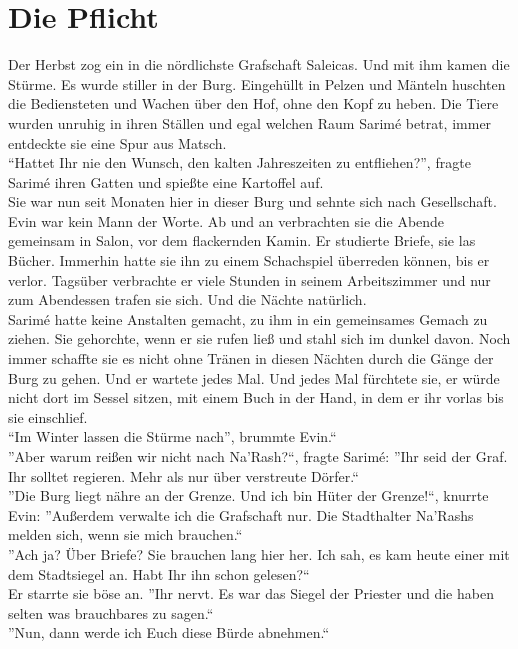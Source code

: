 
\chapter{Die Pflicht}

Der Herbst zog ein in die nördlichste Grafschaft Saleicas. Und mit ihm kamen die Stürme. Es wurde 
stiller in der Burg. Eingehüllt in Pelzen und Mänteln huschten die Bediensteten und Wachen über den 
Hof, ohne den Kopf zu heben. Die Tiere wurden unruhig in ihren Ställen und egal welchen Raum Sarimé 
betrat, immer entdeckte sie eine Spur aus Matsch.\\
``Hattet Ihr nie den Wunsch, den kalten Jahreszeiten zu entfliehen?'', fragte Sarimé ihren Gatten 
und spießte eine Kartoffel auf.\\
Sie war nun seit Monaten hier in dieser Burg und sehnte sich nach Gesellschaft. Evin war kein Mann 
der Worte. Ab und an verbrachten sie die Abende gemeinsam in Salon, vor dem flackernden Kamin. Er 
studierte Briefe, sie las Bücher. Immerhin hatte sie ihn zu einem Schachspiel überreden können, bis 
er verlor. Tagsüber verbrachte er viele Stunden in seinem Arbeitszimmer und nur zum Abendessen 
trafen sie sich. Und die Nächte natürlich.\\
Sarimé hatte keine Anstalten gemacht, zu ihm in ein gemeinsames Gemach zu ziehen. Sie gehorchte, 
wenn er sie rufen ließ und stahl sich im dunkel davon. Noch immer schaffte sie es nicht ohne Tränen 
in diesen Nächten durch die Gänge der Burg zu gehen. Und er wartete jedes Mal. Und jedes Mal 
fürchtete sie, er würde nicht dort im Sessel sitzen, mit einem Buch in der Hand, in dem er ihr 
vorlas bis sie einschlief.\\
``Im Winter lassen die Stürme nach'', brummte Evin.``\\
''Aber warum reißen wir nicht nach Na'Rash?``, fragte Sarimé: ''Ihr seid der Graf. Ihr solltet 
regieren. Mehr als nur über verstreute Dörfer.``\\
''Die Burg liegt nähre an der Grenze. Und ich bin Hüter der Grenze!``, knurrte Evin: ''Außerdem 
verwalte ich die Grafschaft nur. Die Stadthalter Na'Rashs melden sich, wenn sie mich brauchen.``\\
''Ach ja? Über Briefe? Sie brauchen lang hier her. Ich sah, es kam heute einer mit dem Stadtsiegel 
an. Habt Ihr ihn schon gelesen?``\\
Er starrte sie böse an. ''Ihr nervt. Es war das Siegel der Priester und die haben selten was 
brauchbares zu sagen.``\\
''Nun, dann werde ich Euch diese Bürde abnehmen.``\\
